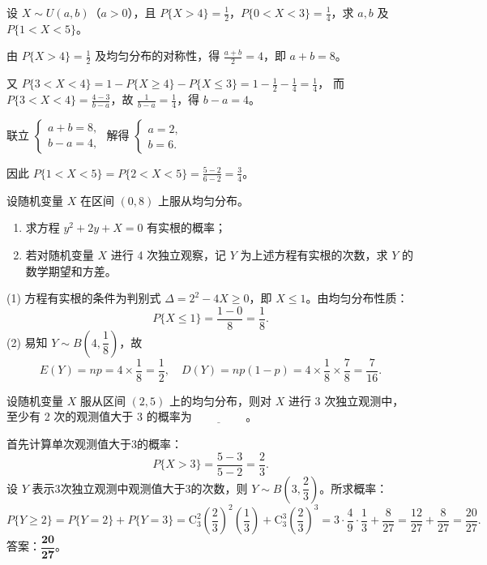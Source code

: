 \documentclass[lang=cn,11pt]{elegantbook}
\begin{document}
\begin{exercise}\label{exer:2-16}
设 $X \sim U(a,b)$（$a>0$），且 $P\{X>4\} = \frac{1}{2}$，$P\{0<X<3\} = \frac{1}{4}$，求 $a,b$ 及 $P\{1<X<5\}$。
\end{exercise}
\begin{solution}
由 $P\{X>4\} = \frac{1}{2}$ 及均匀分布的对称性，得 $\frac{a+b}{2} = 4$，即 $a+b=8$。

又 $P\{3<X<4\} = 1 - P\{X \ge 4\} - P\{X \le 3\} = 1 - \frac{1}{2} - \frac{1}{4} = \frac{1}{4}$，
而 $P\{3<X<4\} = \frac{4-3}{b-a}$，故 $\frac{1}{b-a} = \frac{1}{4}$，得 $b-a=4$。

联立 $\begin{cases} a+b=8, \\ b-a=4, \end{cases}$ 解得 $\begin{cases} a=2, \\ b=6. \end{cases}$

因此 $P\{1<X<5\} = P\{2<X<5\} = \frac{5-2}{6-2} = \frac{3}{4}$。
\end{solution}


\begin{exercise}\label{exer:2-29}
设随机变量 $X$ 在区间 $(0,8)$ 上服从均匀分布。
\begin{enumerate}
    \item[(1)] 求方程 $y^2 + 2y + X = 0$ 有实根的概率；
    \item[(2)] 若对随机变量 $X$ 进行 4 次独立观察，记 $Y$ 为上述方程有实根的次数，求 $Y$ 的数学期望和方差。
\end{enumerate}
\end{exercise}
\begin{solution}
(1) 方程有实根的条件为判别式 $\Delta = 2^2 - 4X \ge 0$，即 $X \le 1$。由均匀分布性质：
\[
P\{X \le 1\} = \frac{1-0}{8} = \frac{1}{8}.
\]
(2) 易知 $Y \sim B\!\left(4,\dfrac{1}{8}\right)$，故
\[
E(Y) = np = 4 \times \frac{1}{8} = \frac{1}{2}, \quad D(Y) = np(1-p) = 4 \times \frac{1}{8} \times \frac{7}{8} = \frac{7}{16}.
\]
\end{solution}


\begin{exercise}[均匀分布与二项分布结合] \label{exer:2-40}
设随机变量 $X$ 服从区间 $(2,5)$ 上的均匀分布，则对 $X$ 进行 3 次独立观测中，至少有 2 次的观测值大于 3 的概率为$\underline{\hspace{2cm}}$。
\end{exercise}
\begin{solution}
首先计算单次观测值大于3的概率：
\[
P\{X>3\} = \frac{5-3}{5-2} = \frac{2}{3}.
\]
设 $Y$ 表示3次独立观测中观测值大于3的次数，则 $Y\sim B\left(3,\dfrac{2}{3}\right)$。所求概率：
\[
P\{Y\geqslant2\} = P\{Y=2\} + P\{Y=3\} = \mathrm{C}_3^2\left(\frac{2}{3}\right)^2\left(\frac{1}{3}\right) + \mathrm{C}_3^3\left(\frac{2}{3}\right)^3 = 3\cdot\frac{4}{9}\cdot\frac{1}{3} + \frac{8}{27} = \frac{12}{27} + \frac{8}{27} = \frac{20}{27}.
\]
答案：$\boldsymbol{\dfrac{20}{27}}$。
\end{solution}
\end{document}
